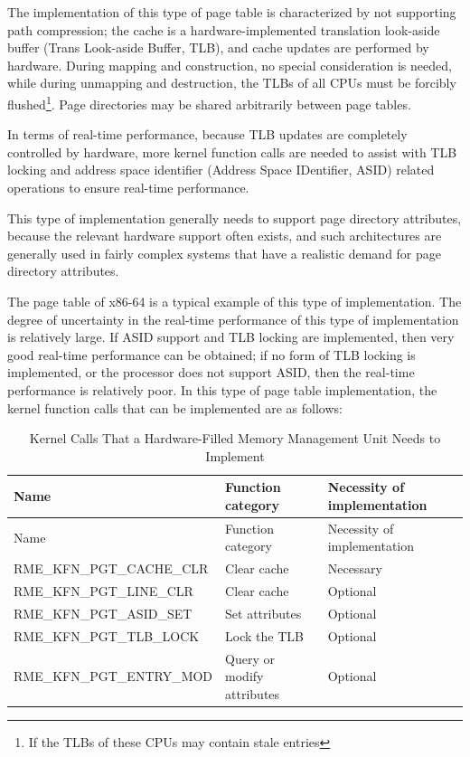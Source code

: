 The implementation of this type of page table is characterized by not supporting path compression; the cache is a hardware-implemented translation look-aside buffer (Trans
Look-aside
Buffer, TLB), and cache updates are performed by hardware. During mapping and construction, no special consideration is needed, while during unmapping and destruction, the TLBs of all CPUs must be forcibly flushed\footnote{If the TLBs of these CPUs may contain stale entries}. Page directories may be shared arbitrarily between page tables.

In terms of real-time performance, because TLB updates are completely controlled by hardware, more kernel function calls are needed to assist with TLB locking and address space identifier (Address
Space IDentifier, ASID) related operations to ensure real-time performance.

This type of implementation generally needs to support page directory attributes, because the relevant hardware support often exists, and such architectures are generally used in fairly complex systems that have a realistic demand for page directory attributes.

The page table of x86-64 is a typical example of this type of implementation. The degree of uncertainty in the real-time performance of this type of implementation is relatively large. If ASID support and TLB locking are implemented, then very good real-time performance can be obtained; if no form of TLB locking is implemented, or the processor does not support ASID, then the real-time performance is relatively poor. In this type of page table implementation, the kernel function calls that can be implemented are as follows:

\begin{xltabular}{\textwidth}{@{}>{\hsize\raggedright\arraybackslash}X>{\hsize\raggedright\arraybackslash}X>{\hsize\raggedright\arraybackslash}X@{}}
\caption{Kernel Calls That a Hardware-Filled Memory Management Unit Needs to Implement}\label{tab:8-4-kernel-calls-required-by-hardware-filled-mmu}\\
\toprule
Name & Function category & Necessity of implementation\tabularnewline
\endfirsthead
\toprule
Name & Function category & Necessity of implementation\tabularnewline
\midrule
\endhead
\bottomrule
\endlastfoot
RME\_KFN\_PGT\_CACHE\_CLR & Clear cache & Necessary\tabularnewline
RME\_KFN\_PGT\_LINE\_CLR & Clear cache & Optional\tabularnewline
RME\_KFN\_PGT\_ASID\_SET & Set attributes & Optional\tabularnewline
RME\_KFN\_PGT\_TLB\_LOCK & Lock the TLB & Optional\tabularnewline
RME\_KFN\_PGT\_ENTRY\_MOD & Query or modify attributes & Optional\tabularnewline
\end{xltabular}
\nopagebreak[4]

